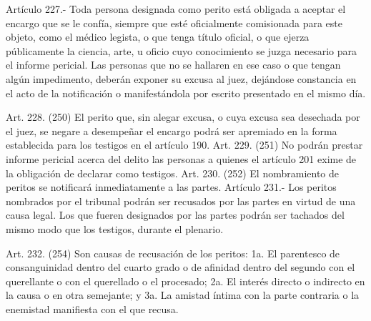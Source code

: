     Artículo 227.- Toda persona designada como perito está obligada a aceptar el encargo que se le confía, siempre que esté oficialmente comisionada para este objeto, como el médico legista, o que tenga título oficial, o que ejerza públicamente la ciencia, arte, u oficio cuyo conocimiento se juzga necesario para el informe pericial.
    Las personas que no se hallaren en ese caso o que tengan algún impedimento, deberán exponer su excusa al juez, dejándose constancia en el acto de la notificación o manifestándola por escrito presentado en el mismo día.

    Art. 228. (250) El perito que, sin alegar excusa, o cuya excusa sea desechada por el juez, se negare a desempeñar el encargo podrá ser apremiado en la forma establecida para los testigos en el artículo 190.
    Art. 229. (251) No podrán prestar informe pericial acerca del delito las personas a quienes el artículo 201 exime de la obligación de declarar como testigos.
    Art. 230. (252) El nombramiento de peritos se notificará inmediatamente a las partes.
    Artículo 231.- Los peritos nombrados por el tribunal podrán ser recusados por las partes en virtud de una causa legal. Los que fueren designados por las partes podrán ser tachados del mismo modo que los testigos, durante el plenario.

    Art. 232. (254) Son causas de recusación de los peritos:
    1a. El parentesco de consanguinidad dentro del cuarto grado o de afinidad dentro del segundo con el querellante o con el querellado o el procesado;
    2a. El interés directo o indirecto en la causa o en otra semejante; y
    3a. La amistad íntima con la parte contraria o la enemistad manifiesta con el que recusa.




